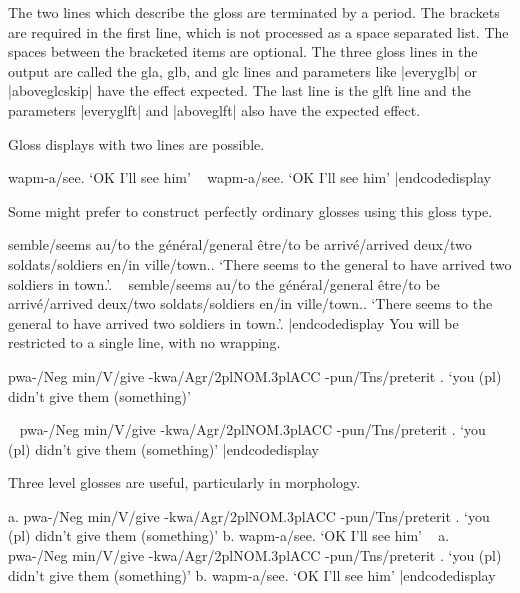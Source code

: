 \smallskip
\noindent The two lines which describe the gloss are terminated
by a period.  The brackets are required in the first line, which
is not processed as a space separated list.  The spaces between
the bracketed items are optional. The three gloss lines in the
output are called the gla, glb, and glc lines and parameters like
|everyglb| or |aboveglcskip| have the effect expected.  The last
line is the glft line and the parameters |everyglft| and
|aboveglft| also have the expected effect.

Gloss displays with two lines are possible.

\framedisplay
\ex
{} {wapm-a/see}.
`OK I'll see him'
\endgl
\xe
\endframedisplay
\codedisplay~
\ex
{} {wapm-a/see}.
`OK I'll see him'
\endgl
\xe
|endcodedisplay

Some might prefer to construct perfectly ordinary glosses using
this gloss type.

\framedisplay
\ex
{} {semble/seems} {au/to the} {g\'en\'eral/general}
{\^etre/to be} {arriv\'e/arrived} {deux/two} {soldats/soldiers}
{en/in} {ville/town.}.
`There seems to the general to have arrived two soldiers in
town{.}'.
\endgl
\xe
\endframedisplay
\codedisplay~
\ex
{} {semble/seems} {au/to the} {g\'en\'eral/general}
{\^etre/to be} {arriv\'e/arrived} {deux/two} {soldats/soldiers}
{en/in} {ville/town.}.
`There seems to the general to have arrived two soldiers in town{.}'.
\endgl
\xe
|endcodedisplay
\noindent You will be restricted to a single line, with no
wrapping.

\framedisplay
\ex[glstyle=3level]
\begingl
{pwa-/Neg} {min/V/give} {-kwa/Agr/2pl{\sc NOM}.3pl\sc ACC}
{-pun/Tns/preterit} .
`you (pl) didn't give them (something)'
\endgl
\xe
\endframedisplay

\codedisplay~
\ex[glstyle=3level]
\begingl
{pwa-/Neg} {min/V/give} {-kwa/Agr/2pl{\sc NOM}.3pl\sc ACC}
{-pun/Tns/preterit} .
`you (pl) didn't give them (something)'
\endgl
\xe
|endcodedisplay

Three level glosses are useful, particularly in
morphology.

\framedisplay
\ex[glstyle=3level]
a.\quad
\begingl
{pwa-/Neg} {min/V/give} {-kwa/Agr/2pl{\sc NOM}.3pl\sc ACC} {-pun/Tns/preterit} .
`you (pl) didn't give them (something)'
\endgl
\hfil
b.\quad
{} {wapm-a/see}.
`OK I'll see him'
\endgl
\xe
\endframedisplay
\codedisplay~
\ex[glstyle=3level]
a.\quad
\begingl
{pwa-/Neg} {min/V/give} {-kwa/Agr/2pl{\sc NOM}.3pl\sc ACC}
{-pun/Tns/preterit} .
`you (pl) didn't give them (something)'
\endgl
\hfil
b.\quad
{} {wapm-a/see}.
`OK I'll see him'
\endgl
\xe|endcodedisplay

